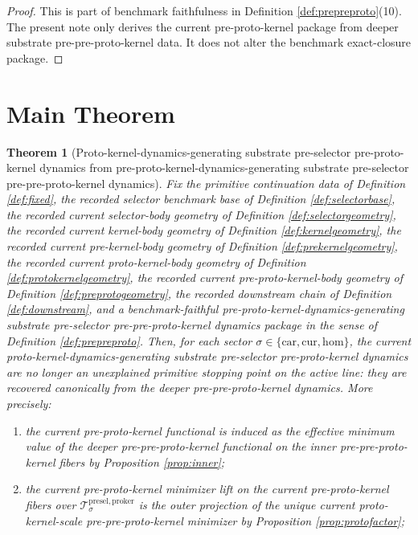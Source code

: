\documentclass[11pt]{article}
\newcommand{\Car}{\mathrm{car}}
\newcommand{\Cur}{\mathrm{cur}}
\newcommand{\Hom}{\mathrm{hom}}
\newcommand{\ProtoKernelBody}[1]{\mathcal T_{#1}^{\mathrm{presel,proker}}}
\newtheorem{theorem}{Theorem}
\begin{document}
\begin{proof}
This is part of benchmark faithfulness in Definition \ref{def:prepreproto}(10). The present note only derives the current pre-proto-kernel package from deeper substrate pre-pre-proto-kernel data. It does not alter the benchmark exact-closure package.
\end{proof}

\section{Main Theorem}

\begin{theorem}[Proto-kernel-dynamics-generating substrate pre-selector pre-proto-kernel dynamics from pre-proto-kernel-dynamics-generating substrate pre-selector pre-pre-proto-kernel dynamics]
\label{thm:main}
Fix the primitive continuation data of Definition \ref{def:fixed}, the recorded selector benchmark base of Definition \ref{def:selectorbase}, the recorded current selector-body geometry of Definition \ref{def:selectorgeometry}, the recorded current kernel-body geometry of Definition \ref{def:kernelgeometry}, the recorded current pre-kernel-body geometry of Definition \ref{def:prekernelgeometry}, the recorded current proto-kernel-body geometry of Definition \ref{def:protokernelgeometry}, the recorded current pre-proto-kernel-body geometry of Definition \ref{def:preprotogeometry}, the recorded downstream chain of Definition \ref{def:downstream}, and a benchmark-faithful pre-proto-kernel-dynamics-generating substrate pre-selector pre-pre-proto-kernel dynamics package in the sense of Definition \ref{def:prepreproto}. Then, for each sector \(\sigma\in\{\Car,\Cur,\Hom\}\), the current proto-kernel-dynamics-generating substrate pre-selector pre-proto-kernel dynamics are no longer an unexplained primitive stopping point on the active line: they are recovered canonically from the deeper pre-pre-proto-kernel dynamics. More precisely:
\begin{enumerate}
    \item the current pre-proto-kernel functional is induced as the effective minimum value of the deeper pre-pre-proto-kernel functional on the inner pre-pre-proto-kernel fibers by Proposition \ref{prop:inner};
    \item the current pre-proto-kernel minimizer lift on the current pre-proto-kernel fibers over \(\ProtoKernelBody{\sigma}\) is the outer projection of the unique current proto-kernel-scale pre-pre-proto-kernel minimizer by Proposition \ref{prop:protofactor};

\end{enumerate}
\end{theorem}
\end{document}
